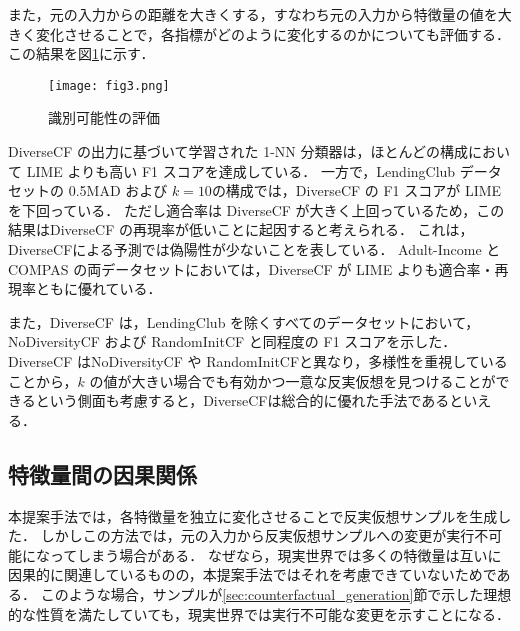 \documentclass[dvipdfmx]{jreport}
\begin{document}
また，元の入力からの距離を大きくする，すなわち元の入力から特徴量の値を大きく変化させることで，各指標がどのように変化するのかについても評価する．
この結果を図\ref{fig:3}に示す．
\begin{figure}[h]
    \begin{center}
        \texttt{[image: fig3.png]} 
        \caption{識別可能性の評価} \label{fig:3}
    \end{center}
\end{figure}

\newpage

DiverseCF の出力に基づいて学習された 1-NN 分類器は，ほとんどの構成において LIME よりも高い F1 スコアを達成している．
一方で，LendingClub データセットの 0.5MAD および $k=10$の構成では，DiverseCF の F1 スコアが LIME を下回っている．
ただし適合率は DiverseCF が大きく上回っているため，この結果はDiverseCF の再現率が低いことに起因すると考えられる．
これは，DiverseCFによる予測では偽陽性が少ないことを表している．
Adult-Income と COMPAS の両データセットにおいては，DiverseCF が LIME よりも適合率・再現率ともに優れている．

また，DiverseCF は，LendingClub を除くすべてのデータセットにおいて，NoDiversityCF および RandomInitCF と同程度の F1 スコアを示した．
DiverseCF はNoDiversityCF や RandomInitCFと異なり，多様性を重視していることから，$k$ の値が大きい場合でも有効かつ一意な反実仮想を見つけることができるという側面も考慮すると，DiverseCFは総合的に優れた手法であるといえる．

\newpage

\subsection{特徴量間の因果関係}
本提案手法では，各特徴量を独立に変化させることで反実仮想サンプルを生成した．
しかしこの方法では，元の入力から反実仮想サンプルへの変更が実行不可能になってしまう場合がある．
なぜなら，現実世界では多くの特徴量は互いに因果的に関連しているものの，本提案手法ではそれを考慮できていないためである．
このような場合，サンプルが\ref{sec:counterfactual_generation}節で示した理想的な性質を満たしていても，現実世界では実行不可能な変更を示すことになる．
\end{document}
